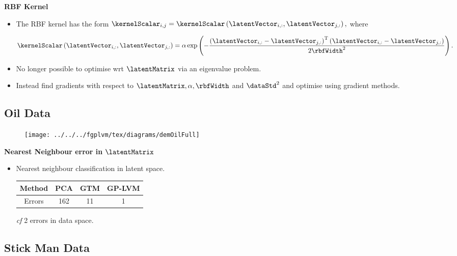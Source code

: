 \textbf{RBF Kernel}
\begin{itemize}
\item The RBF kernel has the form $\kernelScalar_{i,j}=\kernelScalar\left(\latentVector_{i,:},\latentVector_{j,:}\right),$
where


\[
\kernelScalar\left(\latentVector_{i,:},\latentVector_{j,:}\right)=\alpha\exp\left(-\frac{\left(\latentVector_{i,:}-\latentVector_{j,:}\right)^{\mathrm{T}}\left(\latentVector_{i,:}-\latentVector_{j,:}\right)}{2\rbfWidth^{2}}\right).\]


\item No longer possible to optimise wrt $\latentMatrix$ via an eigenvalue
problem.
\item Instead find gradients with respect to $\latentMatrix,\alpha,\rbfWidth$
and $\dataStd^{2}$ and optimise using gradient methods.
\end{itemize}

\subsection{Oil Data}


%
\begin{figure}
\centering{}\texttt{[image: ../../../fgplvm/tex/diagrams/demOilFull]}
\end{figure}



\textbf{Nearest Neighbour error in }$\latentMatrix$
\begin{itemize}
\item Nearest neighbour classification in latent space.


\begin{center}
\begin{tabular}{|c|c|c|c|}
\hline 
Method & PCA & GTM & GP-LVM\tabularnewline
\hline
Errors & 162 & 11 & 1 \tabularnewline
\hline
\end{tabular}
\par\end{center}

\begin{center}
\emph{cf} 2 errors in data space.
\par\end{center}

\end{itemize}

\subsection{Stick Man Data}


